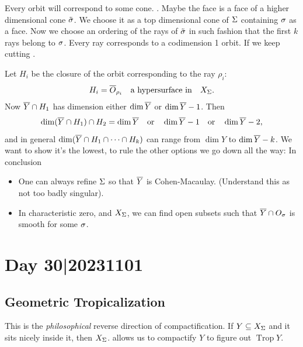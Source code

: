 \documentclass[12pt]{memoir}
\DeclareMathOperator{\Trop}{Trop}
\begin{document}
Every orbit will correspond to some cone. . Maybe the face is a face of a higher dimensional cone $\tilde{\sigma}$. We choose it as a top dimensional cone of $\Sigma$ containing $\sigma$ as a face. Now we choose an ordering of the rays of $\tilde{\sigma}$ in such fashion that the first $k$ rays belong to $\sigma$. Every ray corresponds to a codimension 1 orbit. If we keep cutting .\par 
Let $H_i$ be the closure of the orbit corresponding to the ray $\rho_i$:
$$H_i=\overline O_{\rho_i}\quad\text{a hypersurface in}\quad X_\Sigma.$$
Now $\overline Y\cap H_1$ has dimension either $\dim\overline Y$ or $\dim \overline Y-1$. Then 
$$\dim (\overline Y\cap H_1)\cap H_2=\dim \overline Y\quad\text{or}\quad\dim \overline Y-1\quad\text{or}\quad\dim\overline Y-2,$$
and in general $\dim(\overline Y\cap H_1\cap\cdots\cap H_k)$ can range from $\dim Y$ to $\dim \overline Y-k$. We want to show it's the lowest, to rule the other options we go down all the way:
In conclusion 
\begin{itemize}
    \item One can always refine $\Sigma$ so that $\overline Y$ is Cohen-Macaulay. (Understand this as not too badly singular). 
    \item In characteristic zero, and $X_\Sigma$, we can find open subsets such that $\overline Y\cap O_\sigma$ is smooth for some $\sigma$.
\end{itemize}

\section{Day 30|20231101}

\subsection{Geometric Tropicalization}

This is the \emph{philosophical} reverse direction of compactification. If $Y\subseteq X_\Sigma$ and it sits nicely inside it, then $X_\Sigma$. allows us to compactify $Y$ to figure out $\Trop Y$.
\end{document}
